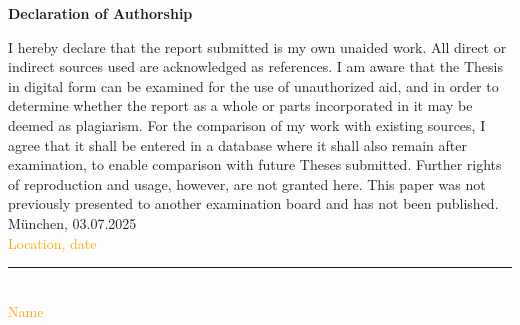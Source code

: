 \documentclass[12pt]{article}
\begin{document}
\newpage


\Large
\noindent
\textbf{Declaration of Authorship}
\vspace{0.5cm}
\noindent
\normalsize

I hereby declare that the report submitted is my own unaided work. All direct
or indirect sources used are acknowledged as references. I am aware that the
Thesis in digital form can be examined for the use of unauthorized aid, and in
order to determine whether the report as a whole or parts incorporated in it may
be deemed as plagiarism. For the comparison of my work with existing sources, I
agree that it shall be entered in a database where it shall also remain after
examination, to enable comparison with future Theses submitted. Further rights
of reproduction and usage, however, are not granted here. This paper was not
previously presented to another examination board and has not been published.
\\

\vspace{1cm}
München, 03.07.2025\\
\textcolor{orange}{Location, date} \\

\vspace{3cm}

\noindent\rule{0.5\textwidth}{0.4pt} \\

\textcolor{orange}{Name}

\end{document}
